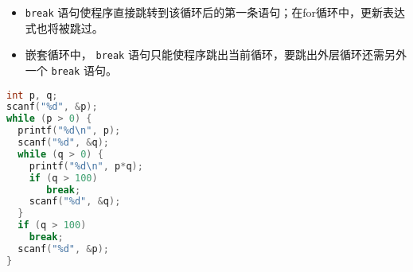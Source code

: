 \begin{frame}[fragile]
\begin{itemize}
\item  \lstinline|break| 语句使程序直接跳转到该循环后的第一条语句；在for循环中，更新表达式也将被跳过。\\[0.1in]
\item 
嵌套循环中， \lstinline|break| 语句只能使程序跳出当前循环，要跳出外层循环还需另外一个 \lstinline|break| 语句。
\end{itemize}
\end{frame}


\begin{frame}[fragile]
\begin{lstlisting}[language=c,frame=single]
int p, q;
scanf("%d", &p);
while (p > 0) {
  printf("%d\n", p);
  scanf("%d", &q);
  while (q > 0) {
    printf("%d\n", p*q);
    if (q > 100)
       break;
    scanf("%d", &q);
  }
  if (q > 100)
    break;
  scanf("%d", &p);
}
\end{lstlisting}
\end{frame}


